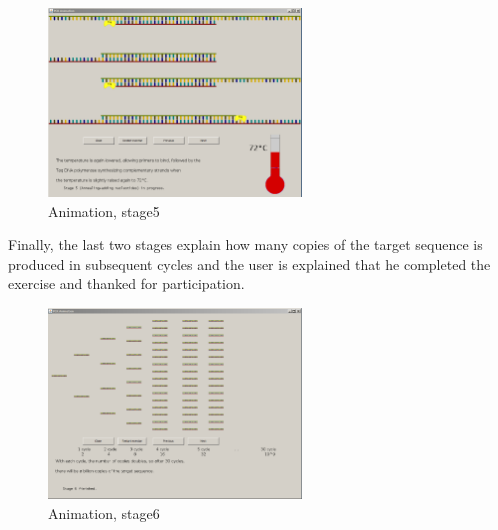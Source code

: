 \begin{figure}[h]
  \begin{center}
	\includegraphics[width=0.6\textwidth]{./images/AnimImpl/Stage5.png}
    \caption{
      \label{fig:AnimImpl:stage5}
      Animation, stage5
    }
  \end{center}
\end{figure}

Finally, the last two stages explain how many copies of the target sequence is produced in subsequent cycles and the user is explained that he completed the exercise and thanked for participation.

\begin{figure}[h]
  \begin{center}
	\includegraphics[width=0.6\textwidth]{./images/AnimImpl/Stage6.png}
    \caption{
      \label{fig:AnimImpl:stage6}
      Animation, stage6
    }
  \end{center}
\end{figure}
